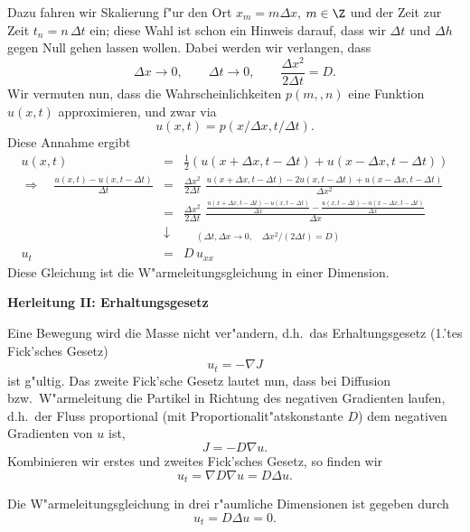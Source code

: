 Dazu fahren wir Skalierung  f"ur den Ort $x_m = m\Delta x$, $m\in\Z$  und der
Zeit  
zur Zeit $t_n=n\,\Delta t$ ein; diese Wahl ist schon ein Hinweis darauf, dass
wir $\Delta t$ und $\Delta h$ gegen Null gehen lassen wollen. Dabei werden wir
verlangen, dass
$$  \Delta x\rightarrow 0,\qquad
    \Delta t\rightarrow 0,\qquad
    \frac{\Delta x^2}{2\Delta t} = D.
$$
Wir vermuten nun, dass die Wahrscheinlichkeiten 
 $p(m,,n)$ eine Funktion $u(x,t)$ approximieren, und zwar via
$$ u(x,t ) = p(x/\Delta x, t/\Delta t).$$
Diese Annahme ergibt
\begin{eqnarray*}
u(x,t) 
& = & \frac 1 2 
\left( u(x+\Delta x, t-\Delta t) + u(x-\Delta x, t-\Delta t) \right)\\
\Rightarrow\quad
\frac{u(x,t)-u(x,t-\Delta t)}{\Delta t}& = & \frac {\Delta x^2}{2\Delta t}\,\, 
\frac{u(x+\Delta x, t-\Delta t)- 2u(x,t-\Delta t)+ u(x-\Delta x, t-\Delta t)}
{\Delta x^2}\\
&=&
 \frac {\Delta x^2}{2\Delta t}\,\, 
\frac{\frac{u(x+\Delta x, t-\Delta t)- u(x,t-\Delta t)}{\Delta x}-\frac{u(x,t-\Delta t)- u(x-\Delta x, t-\Delta t)}{\Delta x}}
{\Delta x}\\
 & \downarrow & \quad_{ (\Delta t,\Delta x \rightarrow 0,\quad 
                 \Delta x^2/(2\Delta t) = D)}\\
u_t & = & D\, u_{xx}
\end{eqnarray*}
Diese Gleichung ist die W"armeleitungsgleichung in einer Dimension.
\par\medskip
{\bf Herleitung II: Erhaltungsgesetz}\par\medskip
Eine Bewegung wird die Masse nicht ver"andern, d.h.\ das Erhaltungsgesetz 
(1.'tes Fick'sches Gesetz)
$$ u_t = - \nabla J$$
ist g"ultig. Das zweite Fick'sche Gesetz lautet nun, dass bei Diffusion bzw.\ 
W"armeleitung die Partikel in Richtung des negativen Gradienten laufen, d.h.\ 
der Fluss proportional (mit Proportionalit"atskonstante $D$) dem negativen 
Gradienten von $u$ ist,
$$ J = - D \nabla u.$$
Kombinieren wir erstes und zweites Fick'sches Gesetz, so finden wir
$$ u_t = \nabla D\nabla u = D\Delta u.$$

\begin{sdefi}
 Die W"armeleitungsgleichung in drei r"aumliche Dimensionen ist gegeben durch
$$ u_{t} = D \Delta u = 0.$$
\end{sdefi}

